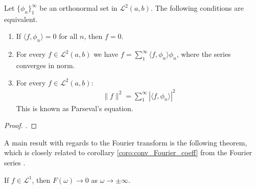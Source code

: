 \begin{theorem}
Let $\{\phi_n\}_1^\infty$ be an orthonormal set in $\mathcal{L}^2(a,b)$. The following conditions are equivalent.
\begin{enumerate}[label=(\alph*)]
\item If $\langle f, \phi_n \rangle = 0$ for all $n$, then $f = 0$.
\item For every $f \in \mathcal{L}^2(a,b)$ we have $f = \sum_1^\infty \langle f, \phi_n \rangle \phi_n$, where the series converges in norm.\\
\item For every $f \in \mathcal{L}^2(a,b)$:
\begin{align*}
\|f\|^2 = \sum_1^\infty |\langle f,\phi_n \rangle|^2
\end{align*}
This is known as Parseval's equation.
\end{enumerate}
\end{theorem}

\begin{proof}
.
\end{proof}

A main result with regards to the Fourier transform is the following theorem, which is closely related to corollary \ref{coro:conv_Fourier_coeff} from the Fourier series \cite{page 217, FAA}.

\begin{theorem}
If $f \in \mathcal{L}^1$, then $F(\omega) \to 0$ as $\omega \to \pm \infty$.
\end{theorem}

